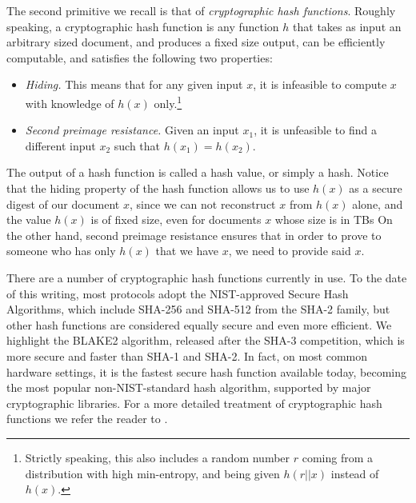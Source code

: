 The second primitive we recall is that of {\em cryptographic hash functions}. Roughly speaking, a cryptographic hash function is any function $h$ that takes as input an arbitrary sized document, and produces a fixed size output, can be efficiently computable, and satisfies the following two properties:
\begin{itemize}
\item {\em Hiding.} This means that for any given input $x$, it is infeasible to compute $x$ with knowledge of $h(x)$ only.\footnote{Strictly speaking, this also includes a random number $r$ coming from a distribution with high min-entropy, and being given $h(r||x)$ instead of $h(x)$.}
\item {\em Second preimage resistance.} Given an input $x_1$, it is unfeasible to find a different input $x_2$ such that $h(x_1)=h(x_2)$.
\end{itemize}
The output of a hash function is called a hash value, or simply a hash. Notice that the hiding property of the hash function allows us to use $h(x)$ as a secure digest of our document $x$, since we can not reconstruct $x$ from $h(x)$ alone, and the value $h(x)$ is of fixed size, even for documents $x$ whose size is in TBs %
On the other hand, second preimage resistance ensures that in order to prove to someone who has only $h(x)$ that we have $x$, we need to provide said $x$. 

There are a number of cryptographic hash functions currently in use. To the date of this writing, most protocols adopt the NIST-approved Secure Hash Algorithms\cite{sha_standard}, which include SHA-256 and SHA-512 from the SHA-2 family, but other hash functions are considered equally secure and even more efficient. We highlight the BLAKE2 algorithm, released after the SHA-3 competition, which is more secure and faster than SHA-1 and SHA-2. In fact, on most common hardware settings, it is the fastest secure hash function available today, becoming the most popular non-NIST-standard hash algorithm, supported by major cryptographic libraries. For a more detailed treatment of cryptographic hash functions we refer the reader to \cite{sha_standard,aumasson,sha3zoo,bitcoinbook}. %

